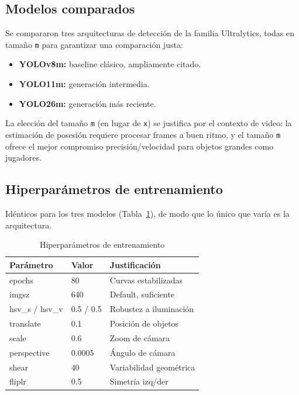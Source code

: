 \documentclass[conference]{IEEEtran}
\begin{document}
\subsection{Modelos comparados}

Se compararon tres arquitecturas de detección de la familia Ultralytics,
todas en tamaño \texttt{m} para garantizar una comparación justa:

\begin{itemize}
    \item \textbf{YOLOv8m:} baseline clásico, ampliamente citado.
    \item \textbf{YOLO11m:} generación intermedia.
    \item \textbf{YOLO26m:} generación más reciente.
\end{itemize}

La elección del tamaño \texttt{m} (en lugar de \texttt{x}) se justifica
por el contexto de video: la estimación de posesión requiere procesar
frames a buen ritmo, y el tamaño \texttt{m} ofrece el mejor compromiso
precisión/velocidad para objetos grandes como jugadores.

\subsection{Hiperparámetros de entrenamiento}

Idénticos para los tres modelos (Tabla~\ref{tab:hparams}), de modo que lo
único que varía es la arquitectura.

\begin{table}[htbp]
\caption{Hiperparámetros de entrenamiento}
\begin{center}
\begin{tabular}{lll}
\toprule
\textbf{Parámetro} & \textbf{Valor} & \textbf{Justificación} \\
\midrule
epochs & 80 & Curvas estabilizadas \\
imgsz & 640 & Default, suficiente \\
hsv\_s / hsv\_v & 0.5 / 0.5 & Robustez a iluminación \\
translate & 0.1 & Posición de objetos \\
scale & 0.6 & Zoom de cámara \\
perspective & 0.0005 & Ángulo de cámara \\
shear & 40 & Variabilidad geométrica \\
fliplr & 0.5 & Simetría izq/der \\
\bottomrule
\end{tabular}
\label{tab:hparams}
\end{center}
\end{table}
\end{document}
